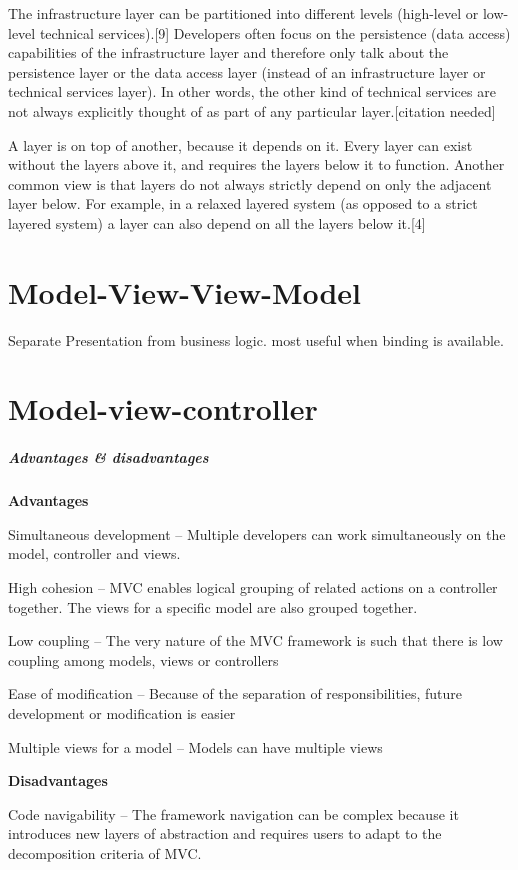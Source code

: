 \documentclass{book}
\begin{document}
The infrastructure layer can be partitioned into different levels (high-level or low-level technical services).[9]
Developers often focus on the persistence (data access) capabilities of the infrastructure layer and therefore only talk about
the persistence layer or the data access layer (instead of an infrastructure layer or technical services layer). 
In other words, the other kind of technical services are not always explicitly thought of as part of any particular layer.[citation needed]

A layer is on top of another, because it depends on it. Every layer can exist without the layers above it, and requires the layers below it to function.
Another common view is that layers do not always strictly depend on only the adjacent layer below.
For example, in a relaxed layered system (as opposed to a strict layered system) a layer can also depend on all the layers below it.[4]
\chapter{Model-View-View-Model}\label{MVVM}
Separate Presentation from business logic.
most useful when binding is available.

\chapter{Model-view-controller}\label{MVCAR}
\paragraph{Advantages \& disadvantages}
\textbf{Advantages}

    Simultaneous development – Multiple developers can work simultaneously on the model, controller and views.

    High cohesion – MVC enables logical grouping of related actions on a controller together. The views for a specific model are also grouped together.

    Low coupling – The very nature of the MVC framework is such that there is low coupling among models, views or controllers

    Ease of modification – Because of the separation of responsibilities, future development or modification is easier

    Multiple views for a model – Models can have multiple views

\textbf{Disadvantages}

    Code navigability – The framework navigation can be complex because it introduces new layers of abstraction and requires users to adapt to the decomposition criteria of MVC.
\end{document}
